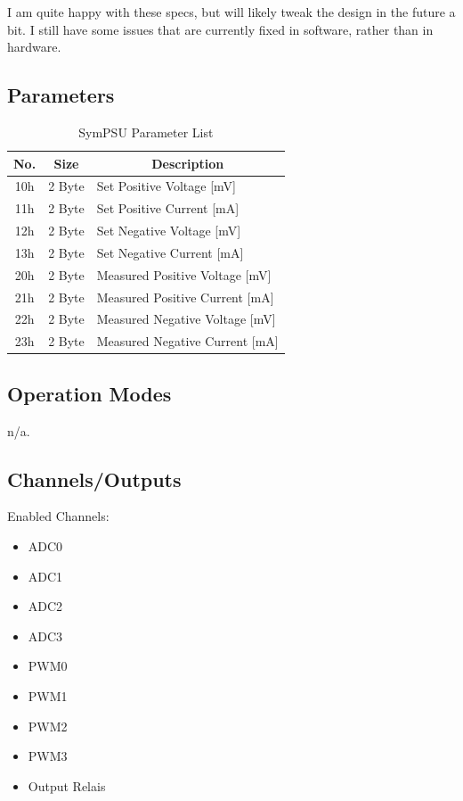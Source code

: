 \begin{table}[H]
I am quite happy with these specs, but will likely tweak the design in the future a bit. I still have some issues that are currently fixed in software, rather than in hardware. 

\subsection{Parameters}
\begin{table}[H]
    \centering
    \begin{tabular}{|c|c|l|}
        \hline
        \textbf{No.}   &   \textbf{Size} & \multicolumn{1}{|c|}{\textbf{Description}}\\ \hline \hline
        10h   &  2 Byte &  Set Positive Voltage [mV]\\ \hline
		11h   &  2 Byte &  Set Positive Current [mA]\\ \hline
		12h   &  2 Byte &  Set Negative Voltage [mV]\\ \hline
		13h   &  2 Byte &  Set Negative Current [mA]\\ \hline
		20h   &  2 Byte &  Measured Positive Voltage [mV]\\ \hline
		21h   &  2 Byte &  Measured Positive Current [mA]\\ \hline
		22h   &  2 Byte &  Measured Negative Voltage [mV]\\ \hline
		23h   &  2 Byte &  Measured Negative Current [mA]\\ \hline
    \end{tabular}
	\caption{SymPSU Parameter List}
\label{tab:Par-SymPSU}
\end{table}
\subsection{Operation Modes}
n/a.
\subsection{Channels/Outputs}
Enabled Channels:
\begin{itemize}
	\item ADC0
	\item ADC1
	\item ADC2
	\item ADC3
	\item PWM0
	\item PWM1
	\item PWM2
	\item PWM3
	\item Output Relais
\end{itemize}


\end{table}
